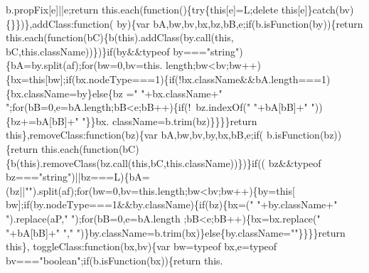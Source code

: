 \begin{DoxyCode}
      b.propFix[e]||e;\textcolor{keywordflow}{return} this.each(\textcolor{keyword}{function}()\{\textcolor{keywordflow}{try}\{\textcolor{keyword}{this}[e]=L;\textcolor{keyword}{delete} \textcolor{keyword}{this}[e]\}\textcolor{keywordflow}{catch}(bv)\{\}\})\},addClass:\textcolor{keyword}{function}(
      by)\{var bA,bw,bv,bx,bz,bB,e;\textcolor{keywordflow}{if}(b.isFunction(by))\{\textcolor{keywordflow}{return} this.each(\textcolor{keyword}{function}(bC)\{b(\textcolor{keyword}{this}).addClass(by.call(\textcolor{keyword}{this},
      bC,\textcolor{keyword}{this}.className))\})\}\textcolor{keywordflow}{if}(by&&typeof by===\textcolor{stringliteral}{"string"})\{bA=by.split(af);\textcolor{keywordflow}{for}(bw=0,bv=this.
      length;bw<bv;bw++)\{bx=\textcolor{keyword}{this}[bw];\textcolor{keywordflow}{if}(bx.nodeType===1)\{\textcolor{keywordflow}{if}(!bx.className&&bA.length===1)\{bx.className=by\}\textcolor{keywordflow}{else}\{bz
      =\textcolor{stringliteral}{" "}+bx.className+\textcolor{stringliteral}{" "};\textcolor{keywordflow}{for}(bB=0,e=bA.length;bB<e;bB++)\{\textcolor{keywordflow}{if}(!~bz.indexOf(\textcolor{stringliteral}{" "}+bA[bB]+\textcolor{stringliteral}{" "}))\{bz+=bA[bB]+\textcolor{stringliteral}{" "}\}\}bx.
      className=b.trim(bz)\}\}\}\}\textcolor{keywordflow}{return} \textcolor{keyword}{this}\},removeClass:\textcolor{keyword}{function}(bz)\{var bA,bw,bv,by,bx,bB,e;\textcolor{keywordflow}{if}(
      b.isFunction(bz))\{\textcolor{keywordflow}{return} this.each(\textcolor{keyword}{function}(bC)\{b(\textcolor{keyword}{this}).removeClass(bz.call(\textcolor{keyword}{this},bC,\textcolor{keyword}{this}.className))\})\}\textcolor{keywordflow}{if}((
      bz&&typeof bz===\textcolor{stringliteral}{"string"})||bz===L)\{bA=(bz||\textcolor{stringliteral}{""}).split(af);\textcolor{keywordflow}{for}(bw=0,bv=this.length;bw<bv;bw++)\{by=\textcolor{keyword}{this}[
      bw];\textcolor{keywordflow}{if}(by.nodeType===1&&by.className)\{\textcolor{keywordflow}{if}(bz)\{bx=(\textcolor{stringliteral}{" "}+by.className+\textcolor{stringliteral}{" "}).replace(aP,\textcolor{stringliteral}{" "});\textcolor{keywordflow}{for}(bB=0,e=bA.length
      ;bB<e;bB++)\{bx=bx.replace(\textcolor{stringliteral}{" "}+bA[bB]+\textcolor{stringliteral}{" "},\textcolor{stringliteral}{" "})\}by.className=b.trim(bx)\}\textcolor{keywordflow}{else}\{by.className=\textcolor{stringliteral}{""}\}\}\}\}\textcolor{keywordflow}{return} \textcolor{keyword}{this}\},
      toggleClass:\textcolor{keyword}{function}(bx,bv)\{var bw=typeof bx,e=typeof bv===\textcolor{stringliteral}{"boolean"};\textcolor{keywordflow}{if}(b.isFunction(bx))\{\textcolor{keywordflow}{return} this.

\end{DoxyCode}
